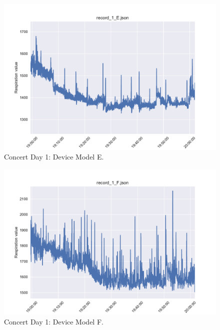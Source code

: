 \begin{figure}
    \centering
    \includegraphics[scale=0.6]{images/record_1_e.pdf}
    \caption{Concert Day 1: Device Model E.}
    \label{fig:concert_day1_e}
\end{figure}

\begin{figure}
    \centering
    \includegraphics[scale=0.6]{images/record_1_f.pdf}
    \caption{Concert Day 1: Device Model F.}
    \label{fig:concert_day1_f}
\end{figure}


